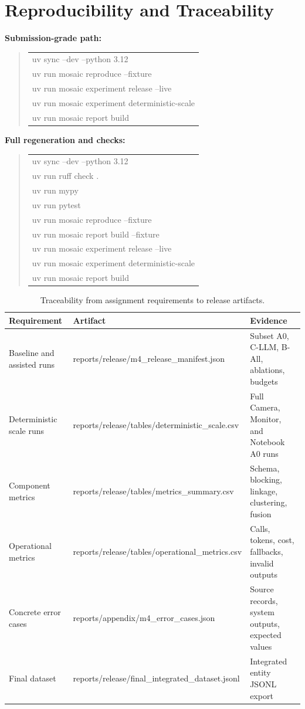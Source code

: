 \documentclass[10pt]{article}
\newcommand{\tighttable}{\scriptsize\setlength{\tabcolsep}{3pt}\renewcommand{\arraystretch}{1.14}}
\begin{document}
\section{Reproducibility and Traceability}
\textbf{Submission-grade path:}
\begin{quote}
\footnotesize\ttfamily
\begin{tabularx}{0.96\linewidth}{Y}
uv sync --dev --python 3.12 \\ uv run mosaic reproduce --fixture \\ uv run mosaic experiment release --live \\ uv run mosaic experiment deterministic-scale \\ uv run mosaic report build
\end{tabularx}
\end{quote}

\textbf{Full regeneration and checks:}
\begin{quote}
\footnotesize\ttfamily
\begin{tabularx}{0.96\linewidth}{Y}
uv sync --dev --python 3.12 \\ uv run ruff check . \\ uv run mypy \\ uv run pytest \\ uv run mosaic reproduce --fixture \\ uv run mosaic report build --fixture \\ uv run mosaic experiment release --live \\ uv run mosaic experiment deterministic-scale \\ uv run mosaic report build
\end{tabularx}
\end{quote}

\begin{table}[H]
\centering
\tighttable
\begin{tabularx}{\linewidth}{YYY}
\toprule
Requirement & Artifact & Evidence \\
\midrule
Baseline and assisted runs & reports/release/m4\_release\_manifest.json & Subset A0, C-LLM, B-All, ablations, budgets \\
Deterministic scale runs & reports/release/tables/deterministic\_scale.csv & Full Camera, Monitor, and Notebook A0 runs \\
Component metrics & reports/release/tables/metrics\_summary.csv & Schema, blocking, linkage, clustering, fusion \\
Operational metrics & reports/release/tables/operational\_metrics.csv & Calls, tokens, cost, fallbacks, invalid outputs \\
Concrete error cases & reports/appendix/m4\_error\_cases.json & Source records, system outputs, expected values \\
Final dataset & reports/release/final\_integrated\_dataset.jsonl & Integrated entity JSONL export \\
\bottomrule
\end{tabularx}
\caption{Traceability from assignment requirements to release artifacts.}
\label{tab:trace}
\end{table}
\end{document}

